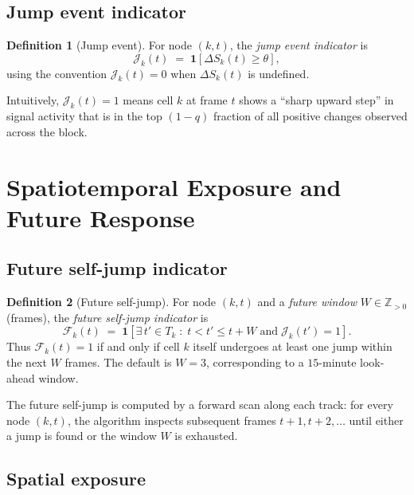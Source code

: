\documentclass[11pt,a4paper]{article}
\theoremstyle{definition}
\newtheorem{definition}{Definition}[section]
\theoremstyle{plain}
\newcommand{\dS}[2]{\Delta S_{#1}(#2)}
\newcommand{\JE}[2]{\mathcal{J}_{#1}(#2)}
\newcommand{\FJ}[2]{\mathcal{F}_{#1}(#2)}
\newcommand{\1}[1]{\mathbf{1}\!\left[#1\right]}
\begin{document}
\subsection{Jump event indicator}

\begin{definition}[Jump event]\label{def:jump}
For node $(k,t)$, the \emph{jump event indicator} is
\[
  \JE{k}{t} \;=\; \1{\dS{k}{t} \geq \theta},
\]
using the convention $\JE{k}{t} = 0$ when $\dS{k}{t}$ is undefined.
\end{definition}

Intuitively, $\JE{k}{t} = 1$ means cell $k$ at frame $t$ shows a ``sharp
upward step'' in signal activity that is in the top $(1-q)$ fraction of all
positive changes observed across the block.

\section{Spatiotemporal Exposure and Future Response}

\subsection{Future self-jump indicator}

\begin{definition}[Future self-jump]\label{def:future-jump}
For node $(k,t)$ and a \emph{future window} $W \in \mathbb{Z}_{>0}$ (frames),
the \emph{future self-jump indicator} is
\[
  \FJ{k}{t} \;=\;
  \1{\exists\, t' \in T_k \;:\; t < t' \leq t + W \;\text{and}\; \JE{k}{t'} = 1}.
\]
Thus $\FJ{k}{t} = 1$ if and only if cell $k$ itself undergoes at least one
jump within the next $W$ frames. The default is $W = 3$, corresponding to a
$15$-minute look-ahead window.
\end{definition}

The future self-jump is computed by a forward scan along each track:
for every node $(k,t)$, the algorithm inspects subsequent frames
$t+1, t+2, \ldots$ until either a jump is found or the window $W$ is
exhausted.

\subsection{Spatial exposure}
\end{document}
